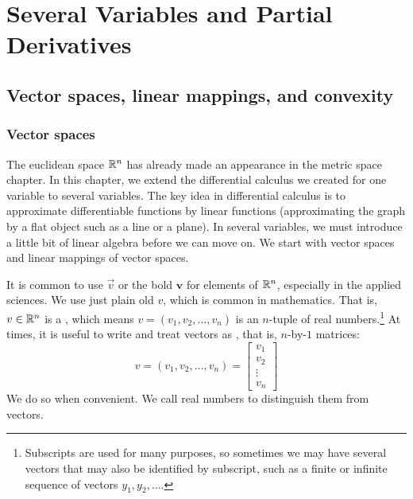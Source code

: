 \chapter{Several Variables and Partial Derivatives} \label{pd:chapter}


\section{Vector spaces, linear mappings, and convexity}
\label{sec:vectorspaces}



\subsection{Vector spaces}

The euclidean space ${\mathbb{R}}^n$ has already made an appearance in the metric
space chapter.  In this chapter, we extend the differential calculus
we created for one variable to several variables.  The key idea in
differential calculus is to approximate differentiable functions by linear
functions
(approximating the graph by a flat object such as a line or a plane).
In several variables, we must introduce a little bit of linear
algebra before we can move on.
We start with vector spaces and linear mappings of vector spaces.

It is common to use $\vec{v}$ or the bold
$\mathbf{v}$ for elements of ${\mathbb{R}}^n$,
especially in the applied sciences.
We use just plain old $v$, which is common in mathematics.
That is, $v \in {\mathbb{R}}^n$ is a \emph{}, which means 
$v = (v_1,v_2,\ldots,v_n)$ is an $n$-tuple of
real numbers.\footnote{Subscripts are used for many purposes,
so sometimes we may have several vectors that may also
be identified by subscript, such as a finite or infinite sequence of
vectors $y_1,y_2,\ldots$.}
At times, it is useful to write and treat vectors as
\emph{}, that is, $n$-by-$1$ matrices:
\begin{equation*}
v =
(v_1,v_2,\ldots,v_n) =
{ \left[
\begin{smallmatrix}
v_1 \\ v_2 \\ \vdots \\ v_n
\end{smallmatrix}
\right]
}
\end{equation*}
We do so when convenient.
We call real numbers
\emph{} to distinguish them from vectors.

